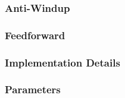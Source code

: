 \subsubsection{Anti-Windup}
\label{sub:AntiWindup}

\subsubsection{Feedforward}
\label{sub:Feedforward}

\subsubsection{Implementation Details}
\label{sub:Implementation Details}

\subsubsection{Parameters}
\label{sub:Parameters}
